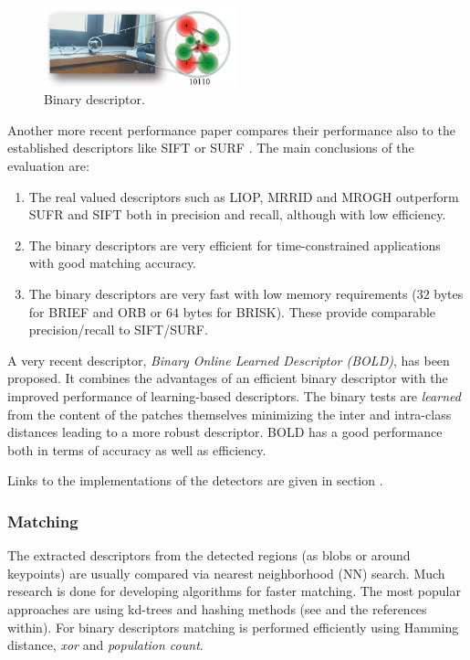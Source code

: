 \begin{figure}[H]
\begin{center}
\includegraphics[width=0.5\textwidth]{fig/BinDescr}
\end{center}
\caption{Binary descriptor.}
\label{fig:bindescr}
\end{figure}

Another more recent performance paper compares their performance also to the established descriptors like SIFT or SURF \cite{conf:icpr:MiksikM12}. The main conclusions of the evaluation are:
\begin{enumerate}
\item{The real valued descriptors such as LIOP, MRRID and MROGH outperform SUFR and SIFT both in precision and recall, although with low efficiency.}
\item{The binary descriptors are very efficient for time-constrained applications with good matching accuracy.}
\item{The binary descriptors are very fast with low memory requirements ($32$ bytes for BRIEF and ORB or $64$ bytes for BRISK). These provide comparable precision/recall to SIFT/SURF.}
\end{enumerate}

A very recent descriptor, {\em Binary Online Learned Descriptor (BOLD)}, \cite{Balntas_2015_CVPR} has been proposed. It combines the advantages of an efficient binary descriptor with the improved performance of learning-based descriptors. The binary tests are {\em learned} from the content of the patches themselves minimizing the inter and  intra-class distances leading to a more robust descriptor. BOLD has a good performance both in terms of accuracy as well as efficiency.

Links to the implementations of the detectors are given in section .
\subsubsection{Matching}
The extracted descriptors from the detected regions (as blobs or around keypoints) are usually compared via nearest neighborhood (NN) search. Much research is done for developing algorithms for faster matching. The most popular approaches are using kd-trees and hashing methods (see \cite{conf:icpr:MiksikM12} and the references within). For binary descriptors matching is performed efficiently using Hamming distance, {\em xor} and {\em population count}.


